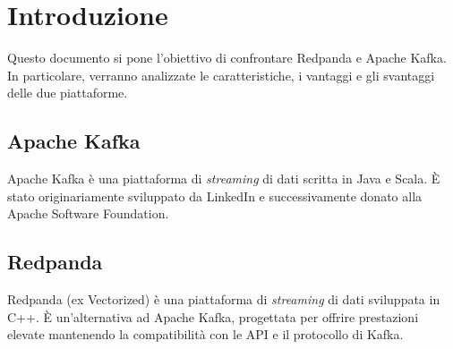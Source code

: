 \section{Introduzione}
Questo documento si pone l'obiettivo di confrontare Redpanda e Apache Kafka.
In particolare, verranno analizzate le caratteristiche, i vantaggi e gli svantaggi delle due piattaforme.\\

\subsection{Apache Kafka}
Apache Kafka è una piattaforma di \textit{streaming} di dati scritta in Java e Scala.
È stato originariamente sviluppato da LinkedIn e successivamente donato alla Apache Software Foundation.

\subsection{Redpanda}
Redpanda (ex Vectorized) è una piattaforma di \textit{streaming} di dati sviluppata in C++.
È un'alternativa ad Apache Kafka, progettata per offrire prestazioni elevate
mantenendo la compatibilità con le API e il protocollo di Kafka.

